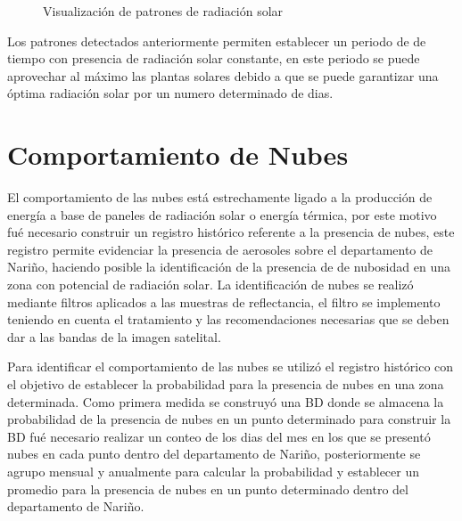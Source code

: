 \begin{figure}[htbp]
  \caption{Visualización de patrones de radiación solar}
  \label{fig:visualizarpatron}
\end{figure}

Los patrones detectados anteriormente permiten establecer un periodo de de tiempo con presencia de radiación solar constante, en este periodo se puede aprovechar 
al máximo las plantas solares debido a que se puede garantizar una óptima radiación solar por un numero determinado de dias.
\newpage

\section{Comportamiento de Nubes}

El comportamiento de las nubes está estrechamente ligado a la producción de energía a base de paneles de radiación solar
o energía térmica, por este motivo fué necesario construir un registro histórico referente a la presencia de nubes, 
este registro permite evidenciar la presencia de aerosoles sobre el departamento de Nariño, haciendo
posible la identificación de la presencia de de nubosidad en una zona con potencial de radiación solar. La identificación de nubes se realizó 
mediante filtros aplicados a las muestras de reflectancia, el filtro se implemento teniendo en cuenta el tratamiento y las recomendaciones necesarias 
que se deben dar a las bandas de la imagen satelital\cite{modisweb}\cite{bandMODISspecification}\cite{cea2005mejoras}.

Para identificar el comportamiento de las nubes se utilizó el registro histórico con el objetivo de establecer la probabilidad 
para la presencia de nubes en una zona determinada. Como primera medida se construyó una BD donde se almacena la 
probabilidad de la presencia de nubes en un punto determinado para construir la BD fué necesario realizar un conteo de los dias
del mes en los que se presentó nubes en cada punto dentro del departamento de Nariño, posteriormente se agrupo mensual y anualmente para calcular 
la probabilidad y establecer un promedio para la presencia de nubes en un punto determinado dentro del departamento de Nariño.

